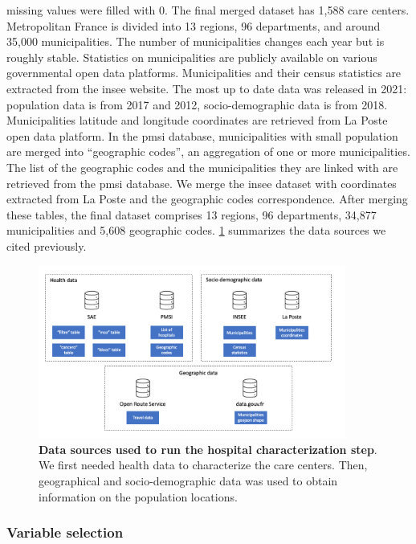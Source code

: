missing values were filled with 0. The final merged dataset has 1,588 care
centers. Metropolitan France is divided into 13 regions, 96 departments, and
around 35,000 municipalities. The number of municipalities changes each year but
is roughly stable. Statistics on municipalities are publicly available on
various governmental open data platforms. Municipalities and their census
statistics are extracted from the \ac{insee} website. The most up to date data
was released in 2021: population data is from 2017 and 2012, socio-demographic
data is from 2018. Municipalities latitude and longitude coordinates are
retrieved from La Poste open data platform. In the \ac{pmsi} database,
municipalities with small population are merged into ``geographic codes'', an
aggregation of one or more municipalities. The list of the geographic codes and
the municipalities they are linked with are retrieved from the \ac{pmsi}
database. We merge the \ac{insee} dataset with coordinates
extracted from La Poste and the geographic codes correspondence. After merging
these tables, the final dataset comprises 13 regions, 96 departments, 34,877
municipalities and 5,608 geographic codes. \cref{fig:data-sources} summarizes
the data sources we cited previously.

\begin{figure}[h]
    \includegraphics[width=0.9\textwidth]{images/camion/databases.png}
    \centering
    \caption{ \textbf{Data sources used to run the hospital characterization
            step}. We first needed health data to characterize the care centers. Then,
        geographical and socio-demographic data was used to obtain information on the
        population locations. }
    \label{fig:data-sources}
\end{figure}

\subsubsection{Variable selection}

